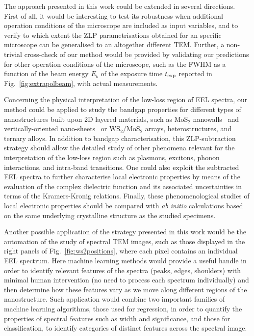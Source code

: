 The approach presented in this work could be extended
in several directions.
%
First of all, it would be interesting to test its robustness when additional
operation conditions of the microscope are included as input variables,
and to verify to which extent the ZLP parametrisations obtained for an specific microscope
can be generalised to an altogether different TEM.
%
Further, a non-trivial cross-check of our method would be provided by validating
our predictions for other operation conditions of the microscope, such
as the FWHM as a function of the beam energy $E_b$ of the exposure time
$t_{\rm exp}$ reported in Fig.~\ref{fig:extrapolbeam},
with actual measurements.

Concerning the physical interpretation of the low-loss region of EEL
spectra, our method could be applied to study the bandgap properties 
for different types
of nanostructures built upon 2D layered materials, such as MoS$_2$ nanowalls~\cite{nanowalls}
and 
vertically-oriented nano-sheets~\cite{D0NR00755B} or
WS$_2$/MoS$_2$ arrays, heterostructures, and ternary alloys.
%
In addition to bandgap characterisation, this ZLP-subtraction
strategy should allow the detailed study
of other phenomena relevant for the interpretation of the low-loss
region such as  plasmons, excitons, phonon interactions, and
intra-band transitions.
%
One could also exploit the subtracted EEL spectra to further characterise
local electronic properties by means of the
 evaluation of the complex dielectric function and its associated
uncertainties in terms of the Kramers-Kronig relations.
%
Finally, these phenomenological studies of local electronic properties should be compared
with {\it ab initio} calculations based
on the same underlying crystalline structure as the studied specimens.

Another possible application of the strategy presented in this work would be the automation of
the study of spectral TEM images,
such as those displayed in the right panels of Fig.~\ref{fig:ws2positions},
where each pixel contains an individual EEL spectrum.
%
Here machine learning methods would provide a  useful handle in order
to identify relevant features of the spectra (peaks, edges, shoulders) with minimal
human intervention (no need to process each spectrum individually) and then determine
how these features vary as we move along different regions of the
nanostructure.
%
Such application would combine two important families of machine learning algorithms,
those used for regression, in order to quantify the properties of spectral
features such as width and significance, and those for classification, to identify categories
of distinct features across the spectral image.

